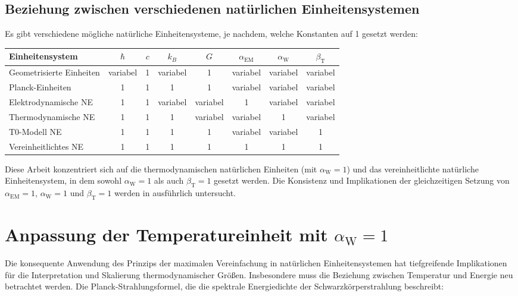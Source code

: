 \documentclass[12pt,a4paper]{article}
\newcommand{\betaT}{\beta_{\text{T}}}
\newcommand{\alphaEM}{\alpha_{\text{EM}}}
\newcommand{\alphaW}{\alpha_{\text{W}}}
\begin{document}
	\subsection{Beziehung zwischen verschiedenen natürlichen Einheitensystemen}
	
	Es gibt verschiedene mögliche natürliche Einheitensysteme, je nachdem, welche Konstanten auf 1 gesetzt werden:
	
	\begin{center}
		\begin{tabular}{|l|c|c|c|c|c|c|c|}
			\hline
			\textbf{Einheitensystem} & \(\hbar\) & \(c\) & \(k_B\) & \(G\) & \(\alphaEM\) & \(\alphaW\) & \(\betaT\) \\
			\hline
			Geometrisierte Einheiten & variabel & 1 & variabel & 1 & variabel & variabel & variabel \\
			Planck-Einheiten & 1 & 1 & 1 & 1 & variabel & variabel & variabel \\
			Elektrodynamische NE & 1 & 1 & variabel & variabel & 1 & variabel & variabel \\
			Thermodynamische NE & 1 & 1 & 1 & variabel & variabel & 1 & variabel \\
			T0-Modell NE & 1 & 1 & 1 & 1 & variabel & variabel & 1 \\
			Vereinheitlichtes NE & 1 & 1 & 1 & 1 & 1 & 1 & 1 \\
			\hline
		\end{tabular}
	\end{center}
	
	Diese Arbeit konzentriert sich auf die thermodynamischen natürlichen Einheiten (mit \(\alphaW = 1\)) und das vereinheitlichte natürliche Einheitensystem, in dem sowohl \(\alphaW = 1\) als auch \(\betaT = 1\) gesetzt werden. Die Konsistenz und Implikationen der gleichzeitigen Setzung von \(\alphaEM = 1\), \(\alphaW = 1\) und \(\betaT = 1\) werden in \cite{pascher_alphabeta_2025} ausführlich untersucht.
	
	\section{Anpassung der Temperatureinheit mit \(\alphaW = 1\)}
	
	Die konsequente Anwendung des Prinzips der maximalen Vereinfachung in natürlichen Einheitensystemen hat tiefgreifende Implikationen für die Interpretation und Skalierung thermodynamischer Größen. Insbesondere muss die Beziehung zwischen Temperatur und Energie neu betrachtet werden. Die Planck-Strahlungsformel, die die spektrale Energiedichte der Schwarzkörperstrahlung beschreibt:
	
\end{document}
